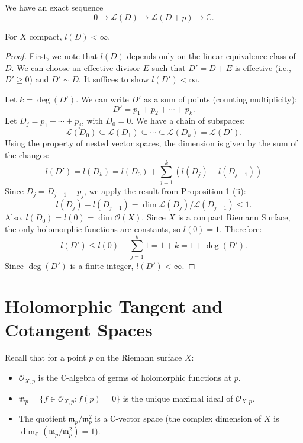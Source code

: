 \documentclass{article}
\begin{document}
\begin{remark}
We have an exact sequence
$$ 0 \to \mathcal{L}(D) \to \mathcal{L}(D+p) \to \mathbb{C}. $$
\end{remark}

\begin{proposition}
For $X$ compact, $l(D) < \infty$.
\end{proposition}

\begin{proof}
First, we note that $l(D)$ depends only on the linear equivalence class of $D$. We can choose an effective divisor $E$ such that $D' = D + E$ is effective (i.e., $D' \ge 0$) and $D' \sim D$. It suffices to show $l(D') < \infty$.

Let $k = \deg(D')$. We can write $D'$ as a sum of points (counting multiplicity):
$$ D' = p_1 + p_2 + \cdots + p_k. $$
Let $D_j = p_1 + \cdots + p_j$, with $D_0 = 0$.
We have a chain of subspaces:
$$ \mathcal{L}(D_0) \subseteq \mathcal{L}(D_1) \subseteq \cdots \subseteq \mathcal{L}(D_k) = \mathcal{L}(D'). $$
Using the property of nested vector spaces, the dimension is given by the sum of the changes:
$$ l(D') = l(D_k) = l(D_0) + \sum_{j=1}^{k} (l(D_j) - l(D_{j-1})) $$
Since $D_j = D_{j-1} + p_j$, we apply the result from Proposition 1 (ii):
$$ l(D_j) - l(D_{j-1}) = \dim \mathcal{L}(D_j)/\mathcal{L}(D_{j-1}) \le 1. $$
Also, $l(D_0) = l(0) = \dim \mathcal{O}(X)$. Since $X$ is a compact Riemann Surface, the only holomorphic functions are constants, so $l(0)=1$.
Therefore:
$$ l(D') \le l(0) + \sum_{j=1}^{k} 1 = 1 + k = 1 + \deg(D'). $$
Since $\deg(D')$ is a finite integer, $l(D') < \infty$.
\end{proof}

\section{Holomorphic Tangent and Cotangent Spaces}

Recall that for a point $p$ on the Riemann surface $X$:
\begin{itemize}
    \item $\mathcal{O}_{X,p}$ is the $\mathbb{C}$-algebra of germs of holomorphic functions at $p$.
    \item $\mathfrak{m}_p = \{f \in \mathcal{O}_{X,p} : f(p) = 0\}$ is the unique maximal ideal of $\mathcal{O}_{X,p}$.
    \item The quotient $\mathfrak{m}_p / \mathfrak{m}_p^2$ is a $\mathbb{C}$-vector space (the complex dimension of $X$ is $\dim_{\mathbb{C}}(\mathfrak{m}_p / \mathfrak{m}_p^2) = 1$).
\end{itemize}
\end{document}
